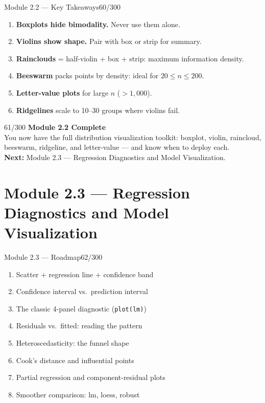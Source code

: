 \documentclass[10pt]{beamer}
\newcommand{\smark}[1]{\hfill{\scriptsize\color{codegray}#1}}
\begin{document}
\begin{frame}{Module 2.2 --- Key Takeaways}\smark{60/300}
\begin{enumerate}
    \item \textbf{Boxplots hide bimodality.} Never use them alone.
    \item \textbf{Violins show shape.} Pair with box or strip for summary.
    \item \textbf{Rainclouds} = half-violin + box + strip: maximum information density.
    \item \textbf{Beeswarm} packs points by density: ideal for $20 \leq n \leq 200$.
    \item \textbf{Letter-value plots} for large $n$ ($> 1{,}000$).
    \item \textbf{Ridgelines} scale to 10--30 groups where violins fail.
\end{enumerate}
\end{frame}

\begin{frame}{}\smark{61/300}
\centering\vspace{1.5cm}
{\Large\textbf{Module 2.2 Complete}}\\[0.5cm]
You now have the full distribution visualization toolkit: boxplot, violin, raincloud, beeswarm, ridgeline, and letter-value --- and know when to deploy each.\\[0.5cm]
\textbf{Next:} Module 2.3 --- Regression Diagnostics and Model Visualization.
\end{frame}

\section{Module 2.3 --- Regression Diagnostics and Model Visualization}

\begin{frame}{Module 2.3 --- Roadmap}\smark{62/300}
\begin{enumerate}
    \item Scatter + regression line + confidence band
    \item Confidence interval vs.\ prediction interval
    \item The classic 4-panel diagnostic (\texttt{plot(lm)})
    \item Residuals vs.\ fitted: reading the pattern
    \item Heteroscedasticity: the funnel shape
    \item Cook's distance and influential points
    \item Partial regression and component-residual plots
    \item Smoother comparison: lm, loess, robust
\end{enumerate}
\end{frame}
\end{document}
